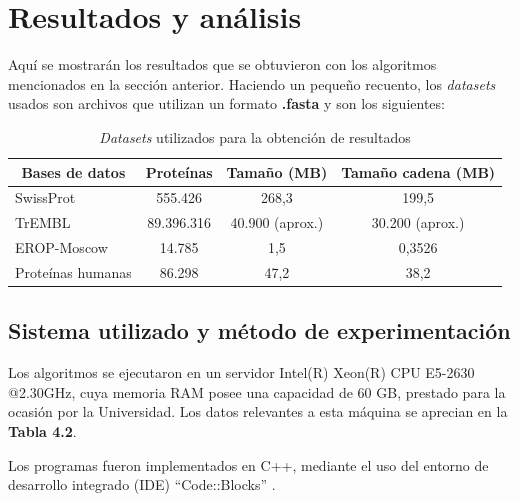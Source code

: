 \chapter{Resultados y análisis}

Aquí se mostrarán los resultados que se obtuvieron con los algoritmos mencionados en la sección anterior. Haciendo un pequeño recuento, los \textit{datasets} usados son archivos que utilizan un formato \textbf{.fasta} y son los siguientes:

\begin{table}[h]
\centering
\begin{tabular}{|l|c|c|c|}
\hline
\multicolumn{1}{|c|}{\textbf{Bases de datos}} & \textbf{Proteínas} & \textbf{Tamaño (MB)} & \textbf{Tamaño cadena (MB)} \\ \hline
SwissProt    & 555.426                & 268,3                & 199,5              \\
TrEMBL        & 89.396.316              & 40.900 (aprox.)       & 30.200 (aprox.)     \\
EROP-Moscow        & 14.785                 & 1,5                  & 0,3526                \\
Proteínas humanas     & 86.298                 & 47,2                 & 38,2               \\ \hline
\end{tabular}
\caption{\textit{Datasets} utilizados para la obtención de resultados}
\label{tb:labelr1}
\end{table} 

\section{Sistema utilizado y método de experimentación}

Los algoritmos se ejecutaron en un servidor Intel(R) Xeon(R) CPU E5-2630 @2.30GHz, cuya memoria RAM posee una capacidad de 60 GB, prestado para la ocasión por la Universidad. Los datos relevantes a esta máquina se aprecian en la \textbf{Tabla 4.2}.

Los programas fueron implementados en C++, mediante el uso del entorno de desarrollo integrado (IDE) ``Code::Blocks'' \cite{codeblocks}. 

\newpage

